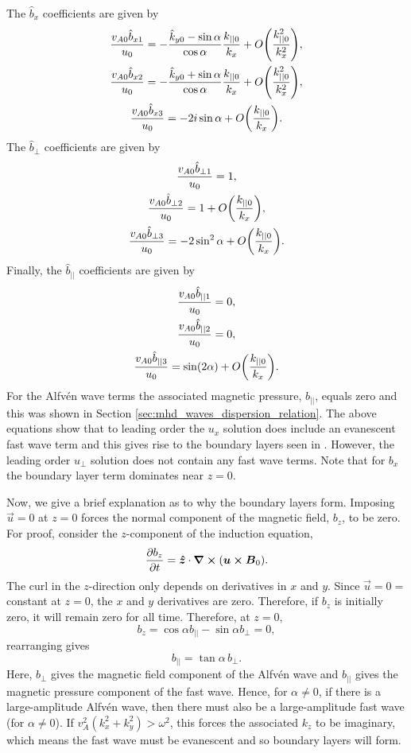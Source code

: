 The $\hat{b}_x$ coefficients are given by
\begin{gather}
    \frac{v_{A0}\hat{b}_{x1}}{u_0} = -\frac{\hat{k}_{y0}-\sin\alpha}{\cos\alpha}\frac{k_{||0}}{k_x} + O\qty(\frac{k_{||0}^2}{k_x^2}), \\
    \frac{v_{A0}\hat{b}_{x2}}{u_0} = -\frac{\hat{k}_{y0}+\sin\alpha}{\cos\alpha}\frac{k_{||0}}{k_x} + O\qty(\frac{k_{||0}^2}{k_x^2}), \\
    \frac{v_{A0}\hat{b}_{x3}}{u_0} = -2i\sin\alpha + O\qty(\frac{k_{||0}}{k_x}).
\end{gather}
The $\hat{b}_\perp$ coefficients are given by
\begin{gather}
    \frac{v_{A0}\hat{b}_{\perp1}}{u_0} = 1, \\
    \frac{v_{A0}\hat{b}_{\perp2}}{u_0} = 1 + O\qty(\frac{k_{||0}}{k_x}), \\
    \frac{v_{A0}\hat{b}_{\perp3}}{u_0} = -2\sin^2\alpha + O\qty(\frac{k_{||0}}{k_x}).
\end{gather}
Finally, the $\hat{b}_{||}$ coefficients are given by
\begin{gather}
    \frac{v_{A0}\hat{b}_{||1}}{u_0} = 0, \\
    \frac{v_{A0}\hat{b}_{||2}}{u_0} = 0, \\
    \label{eq:chap_4_oblique_b_par3}
    \frac{v_{A0}\hat{b}_{||3}}{u_0} = \sin(2\alpha) + O\qty(\frac{k_{||0}}{k_x}).
\end{gather}
For the Alfv\'en wave terms the associated magnetic pressure, $b_{||}$, equals zero and this was shown in Section \ref{sec:mhd_waves_dispersion_relation}. The above equations show that to leading order the $u_x$ solution does include an evanescent fast wave term and this gives rise to the boundary layers seen in \citet{Halberstadt1993,Halberstadt1995,Arregui2003}. However, the leading order $u_\perp$ solution does not contain any fast wave terms. Note that for $b_x$ the boundary layer term dominates near $z=0$.

Now, we give a brief explanation as to why the boundary layers form. Imposing $\vec{u}=0$ at $z=0$ forces the normal component of the magnetic field, $b_z$, to be zero. For proof, consider the $z$-component of the induction equation,
\[\pdv{b_z}{t}=\boldsymbol{\hat{z}}\cdot\curl(\boldsymbol{u}\cross\boldsymbol{B}_0).\]
The curl in the $z$-direction only depends on derivatives in $x$ and $y$. Since  $\vec{u}=0=$ constant at $z=0$, the $x$ and $y$ derivatives are zero. Therefore, if $b_z$ is initially zero, it will remain zero for all time. Therefore, at $z=0$,
\[b_z = \cos\alpha b_{||} - \sin\alpha b_\perp=0,\]
rearranging gives
\[b_{||} = \tan\alpha\, b_\perp.\]
Here, $b_\perp$ gives the magnetic field component of the Alfv\'en wave and $b_{||}$ gives the magnetic pressure component of the fast wave. Hence, for $\alpha\ne0$, if there is a large-amplitude Alfv\'en wave, then there must also be a large-amplitude fast wave (for $\alpha \ne 0$). If $v_A^2(k_x^2+k_y^2)>\omega^2$, this forces the associated $k_z$ to be imaginary, which means the fast wave must be evanescent and so boundary layers will form.

